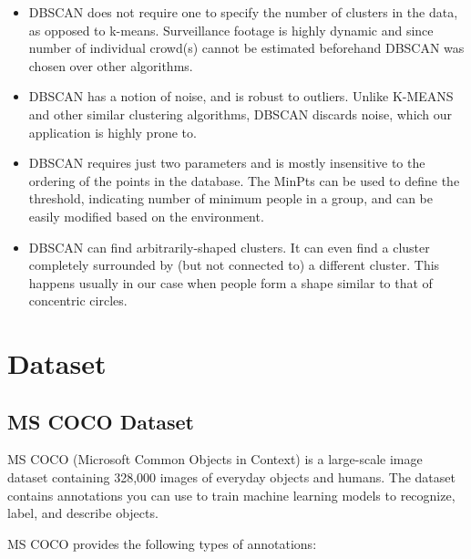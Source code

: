 \documentclass{fisatprojectfinal}
\begin{document}
\begin{itemize}
  \item DBSCAN does not require one to specify the number of clusters in the data, as opposed to k-means. Surveillance footage is highly dynamic and since number of individual crowd(s) cannot be estimated beforehand DBSCAN was chosen over other algorithms.
  \item DBSCAN has a notion of noise, and is robust to outliers. Unlike K-MEANS and other similar clustering algorithms, DBSCAN discards noise, which our application is highly prone to. 
  \item DBSCAN requires just two parameters and is mostly insensitive to the ordering of the points in the database. The MinPts can be used to define the threshold, indicating number of minimum people in a group, and can be easily modified based on the environment.  
  \item DBSCAN can find arbitrarily-shaped clusters. It can even find a cluster completely surrounded by (but not connected to) a different cluster. This happens usually in our case when people form a shape similar to that of concentric circles.
\end{itemize}

\section{Dataset}
\subsection{MS COCO Dataset}
MS COCO (Microsoft Common Objects in Context) is a large-scale image dataset containing 328,000 images of everyday objects and humans. The dataset contains annotations you can use to train machine learning models to recognize, label, and describe objects. 

MS COCO provides the following types of annotations:
\end{document}
